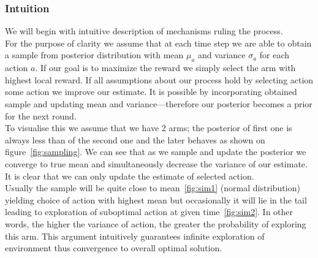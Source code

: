 \documentclass[12pt, a4paper, pdflatex, leqno]{report}
\begin{document}


\subsubsection{Intuition}
We will begin with intuitive description of mechanisms ruling the process.\\
For the purpose of clarity we assume that at each time step we are able to obtain a sample from posterior distribution with mean $\mu_a$ and variance $\sigma_a$ for each action $a$. If our goal is to maximize the reward we simply select the arm with highest local reward. If all assumptions about our process hold by selecting action some action we improve our estimate. It is possible by incorporating obtained sample and updating mean and variance---therefore our posterior becomes a prior for the next round.\\

To visualise this we assume that we have 2 arms; the posterior of first one is always less than of the second one and the later behaves as shown on figure~\ref{fig:sampling}. We can see that as we sample and update the posterior we converge to true mean and simultaneously decrease the variance of our estimate.\\

It is clear that we can only update the estimate of selected action.\\
Usually the sample will be quite close to mean~\ref{fig:sim1} (normal distribution) yielding choice of action with highest mean but occasionally it will lie in the tail leading to exploration of suboptimal action at given time~\ref{fig:sim2}. In other words, the higher the variance of action, the greater the probability of exploring this arm. This argument intuitively guarantees infinite exploration of environment thus convergence to overall optimal solution.
\end{document}
